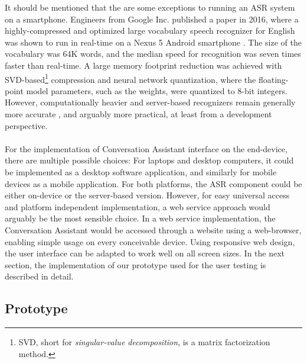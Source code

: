 \documentclass[english, 12pt, a4paper, pdftex, elec, utf8]{aaltothesis}
\begin{document}
It should be mentioned that the are some exceptions to running an ASR system on a smartphone. Engineers from Google Inc. published a paper in 2016, where a highly-compressed and optimized large vocabulary speech recognizer for English was shown to run in real-time on a Nexus 5 Android smartphone \cite{mcgraw2016personalized}. The size of the vocabulary was 64K words, and the median speed for recognition was seven times faster than real-time. A large memory footprint reduction was achieved with SVD-based\footnote{SVD, short for \textit{singular-value decomposition}, is a matrix factorization method.} compression and neural network quantization, where the floating-point model parameters, such as the weights, were quantized to 8-bit integers. However, computationally heavier and server-based recognizers remain generally more accurate \cite{xiong2017microsoft, xiong2016achieving}, and arguably more practical, at least from a development perspective. \\\\
For the implementation of Conversation Assistant interface on the end-device, there are multiple possible choices: For laptops and desktop computers, it could be implemented as a desktop software application, and similarly for mobile devices as a mobile application. For both platforms, the ASR component could be either on-device or the server-based version. However, for easy universal access and platform independent implementation, a web service approach would arguably be the most sensible choice. In a web service implementation, the Conversation Assistant would be accessed through a website using a web-browser, enabling simple usage on every conceivable device. Using responsive web design, the user interface can be adapted to work well on all screen sizes. In the next section, the implementation of our prototype used for the user testing is described in detail.

\subsection{Prototype} \label{sec:prototype}
\end{document}
